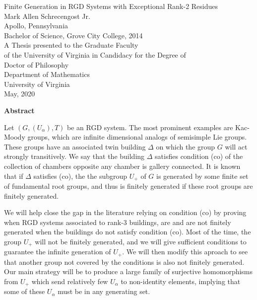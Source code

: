 \documentclass[12 pt,oneside]{book}
\begin{document}
\frontmatter
\begin{center}
	\thispagestyle{empty}
	\vspace*{1 in}
	Finite Generation in RGD Systems with Exceptional Rank-2 Residues\\[1 in]
	Mark Allen Schrecengost Jr.\\
	Apollo, Pennsylvania\\[0.5 in]
	Bachelor of Science, Grove City College, 2014\\[1.5 in]
	A Thesis presented to the Graduate Faculty\\
	of the University of Virginia in Candidacy for the Degree of\\
	Doctor of Philosophy\\[0.5 in]
	Department of Mathematics\\[0.5 in]
	University of Virginia\\
	May, 2020
\end{center}
\vfill
\hfill{}
\clearpage
\thispagestyle{empty}
\begin{center}
	\textbf{Abstract}
\end{center}
Let $(G,(U_\alpha),T)$ be an RGD system. The most prominent examples are Kac-Moody groups, which are infinite dimensional analogs of semisimple Lie groups. These groups have an associated twin building $\Delta$ on which the group $G$ will act strongly transitively. We say that the building $\Delta$ satisfies condition (co) of the collection of chambers opposite any chamber is gallery connected. It is known that if $\Delta$ satisfies (co), the the subgroup $U_+$ of $G$ is generated by some finite set of fundamental root groups, and thus is finitely generated if these root groups are finitely generated.

We will help close the gap in the literature relying on condition (co) by proving when RGD systems associated to rank-3 buildings, are and are not finitely generated when the buildings do not satisfy condition (co). Most of the time, the group $U_+$ will not be finitely generated, and we will give sufficient conditions to guarantee the infinite generation of $U_+.$ We will then modify this aproach to see that another group not covered by the conditions is also not finitely generated. Our main strategy will be to produce a large family of surjective homomorphisms from $U_+$ which send relatively few $U_\alpha$ to non-identity elements, implying that some of these $U_\alpha$ must be in any generating set.
\end{document}
